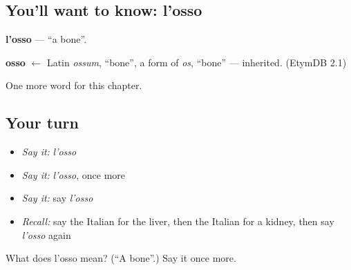 \subsection*{You'll want to know: l'osso}
\textbf{l'osso} — \textquotedblleft{}a bone\textquotedblright{}.

\begin{cousinweb}
\textbf{osso} $\leftarrow$ Latin \emph{ossum}, \textquotedblleft{}bone\textquotedblright{}, a form of \emph{os}, \textquotedblleft{}bone\textquotedblright{} — inherited. (EtymDB 2.1)
\end{cousinweb}

\begin{grammarlens}[title={What you've built}]
One more word for this chapter.
\end{grammarlens}

\subsection*{Your turn}
\begin{itemize}
\raggedright
  \item \emph{Say it:} \emph{l'osso}
  \item \emph{Say it:} \emph{l'osso}, once more
  \item \emph{Say it:} say \emph{l'osso}
  \item \emph{Recall:} say the Italian for the liver, then the Italian for a kidney, then say \emph{l'osso} again
\end{itemize}

\begin{tcolorbox}[breakable,colback=teal!4,colframe=teal!35!black,title={Before you move on}]
What does l'osso mean? (\textquotedblleft{}A bone\textquotedblright{}.) Say it once more.
\end{tcolorbox}
